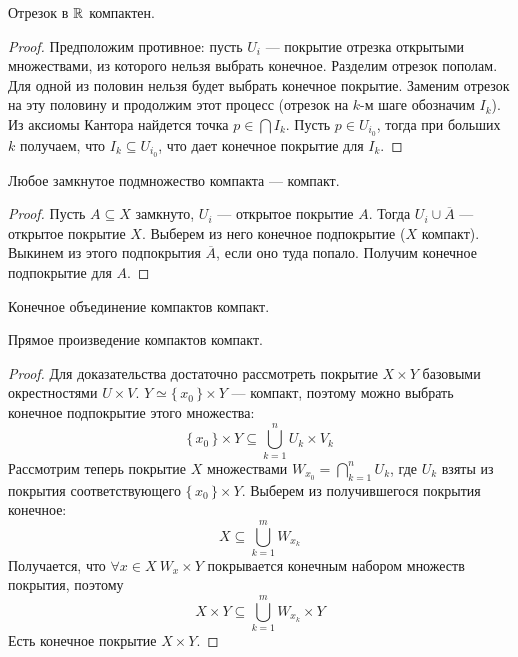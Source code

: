 \begin{theorem}
	Отрезок в $\mathbb{R}$ компактен.
\end{theorem}
\begin{proof}
	Предположим противное: пусть $U_i$ --- покрытие отрезка открытыми множествами,
	из которого нельзя выбрать конечное. Разделим отрезок пополам. Для одной из
	половин нельзя будет выбрать конечное покрытие. Заменим отрезок на эту половину
	и продолжим этот процесс (отрезок на $k$-м шаге обозначим $I_k$).
	Из аксиомы Кантора найдется точка $p \in \bigcap{I_k}$. Пусть $p \in U_{i_0}$,
	тогда при больших $k$ получаем, что $I_k \subseteq U_{i_0}$, что дает конечное
	покрытие для $I_k$.
\end{proof}

\begin{theorem}
	Любое замкнутое подмножество компакта --- компакт.
\end{theorem}
\begin{proof}
	Пусть $A \subseteq X$ замкнуто, $U_i$ --- открытое покрытие $A$.
	Тогда $U_i \cup \overline{A}$ --- открытое покрытие $X$. Выберем из него
	конечное подпокрытие ($X$ компакт). Выкинем из этого подпокрытия $\overline{A}$,
	если оно туда попало. Получим конечное подпокрытие для $A$.
\end{proof}

\begin{remark}
    Конечное объединение компактов компакт.
\end{remark}

\begin{theorem}
	Прямое произведение компактов компакт.
\end{theorem}
\begin{proof}
	Для доказательства достаточно рассмотреть покрытие $X \times Y$ базовыми
	окрестностями $U \times V$. $Y \simeq \{\,x_0\,\} \times Y$ --- компакт,
	поэтому можно выбрать конечное подпокрытие этого множества:
\[
	\{\,x_0\,\} \times Y \subseteq \bigcup_{k = 1}^{n}{U_k \times V_k}
\]
	Рассмотрим теперь покрытие $X$ множествами $W_{x_0} = \bigcap_{k = 1}^{n}{U_k}$,
	где $U_k$ взяты из покрытия соответствующего $\{\,x_0\,\} \times Y$. Выберем
	из получившегося покрытия конечное:
\[
	X \subseteq \bigcup_{k = 1}^{m}{W_{x_k}}
\]
	Получается, что $\forall x \in X~ W_x \times Y$ покрывается конечным набором
	множеств покрытия, поэтому
\[
	X \times Y \subseteq \bigcup_{k = 1}^{m}{W_{x_k} \times Y}
\]
	Есть конечное покрытие $X \times Y$.
\end{proof}

